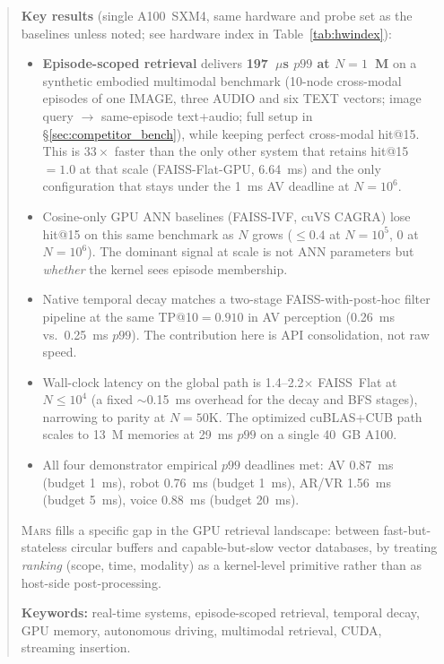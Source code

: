 \documentclass[11pt]{article}
\newcommand{\mars}{\textsc{Mars}}
\begin{document}
\begin{abstract}
\medskip\noindent\textbf{Key results} (single A100~SXM4, same hardware
and probe set as the baselines unless noted; see hardware index in
Table~\ref{tab:hwindex}):
\begin{itemize}
\setlength{\itemsep}{1pt}\setlength{\parskip}{0pt}
\item \textbf{Episode-scoped retrieval} delivers \textbf{197~$\mu$s
  $p99$ at $N{=}1$~M} on a synthetic embodied multimodal benchmark
  (10-node cross-modal episodes of one IMAGE, three AUDIO and six
  TEXT vectors; image query $\to$ same-episode text+audio; full
  setup in \S\ref{sec:competitor_bench}), while keeping perfect
  cross-modal hit@15. This is $33\times$ faster than the only other
  system that retains hit@15${=}1.0$ at that scale (FAISS-Flat-GPU,
  6.64~ms) and the only configuration that stays under the 1~ms AV
  deadline at $N{=}10^6$.
\item Cosine-only GPU ANN baselines (FAISS-IVF, cuVS CAGRA) lose
  hit@15 on this same benchmark as $N$ grows ($\le 0.4$ at
  $N{=}10^5$, $0$ at $N{=}10^6$). The dominant signal at scale is
  not ANN parameters but \emph{whether} the kernel sees episode
  membership.
\item Native temporal decay matches a two-stage FAISS-with-post-hoc
  filter pipeline at the same TP@10${=}0.910$ in AV perception
  (0.26~ms vs.\ 0.25~ms $p99$). The contribution here is API
  consolidation, not raw speed.
\item Wall-clock latency on the global path is 1.4--2.2$\times$
  FAISS~Flat at $N{\le}10^4$ (a fixed $\sim$0.15~ms overhead for the
  decay and BFS stages), narrowing to parity at $N{=}50$K. The
  optimized cuBLAS+CUB path scales to 13~M memories at 29~ms $p99$ on
  a single 40~GB A100.
\item All four demonstrator empirical $p99$ deadlines met:
  AV 0.87~ms (budget 1~ms), robot 0.76~ms (budget 1~ms),
  AR/VR 1.56~ms (budget 5~ms), voice 0.88~ms (budget 20~ms).
\end{itemize}

\noindent \mars{} fills a specific gap in the GPU retrieval landscape:
between fast-but-stateless circular buffers and capable-but-slow
vector databases, by treating \emph{ranking} (scope, time, modality)
as a kernel-level primitive rather than as host-side post-processing.

\textbf{Keywords:} real-time systems, episode-scoped retrieval,
temporal decay, GPU memory, autonomous driving, multimodal retrieval,
CUDA, streaming insertion.
\end{abstract}
\end{document}
